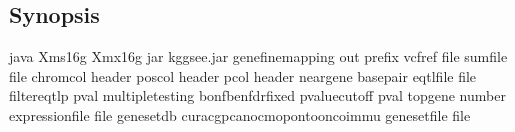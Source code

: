 \documentclass[letterpaper,10pt,english,openany,oneside]{sphinxmanual}
\begin{document}
\subsection{Synopsis}
\label{\detokenize{detailed_document:id2}}
\begin{sphinxVerbatim}[commandchars=\\\{\}]
java \PYGZhy{}Xms16g \PYGZhy{}Xmx16g \PYGZhy{}jar kggsee.jar
  \PYGZhy{}\PYGZhy{}gene\PYGZhy{}finemapping
  \PYGZhy{}\PYGZhy{}out \PYGZlt{}prefix\PYGZgt{}
  \PYGZhy{}\PYGZhy{}vcf\PYGZhy{}ref \PYGZlt{}file\PYGZgt{}
  \PYGZhy{}\PYGZhy{}sum\PYGZhy{}file \PYGZlt{}file\PYGZgt{}
  \PYGZhy{}\PYGZhy{}chrom\PYGZhy{}col \PYGZlt{}header\PYGZgt{}  
  \PYGZhy{}\PYGZhy{}pos\PYGZhy{}col \PYGZlt{}header\PYGZgt{}  
  \PYGZhy{}\PYGZhy{}p\PYGZhy{}col \PYGZlt{}header\PYGZgt{}  
  \PYGZhy{}\PYGZhy{}neargene \PYGZlt{}basepair\PYGZgt{}  
  \PYGZhy{}\PYGZhy{}eqtl\PYGZhy{}file \PYGZlt{}file\PYGZgt{}
  \PYGZhy{}\PYGZhy{}filter\PYGZhy{}eqtl\PYGZhy{}p \PYGZlt{}pval\PYGZgt{}  
  \PYGZhy{}\PYGZhy{}multiple\PYGZhy{}testing \PYGZlt{}bonfbenfdrfixed\PYGZgt{}  
  \PYGZhy{}\PYGZhy{}p\PYGZhy{}value\PYGZhy{}cutoff \PYGZlt{}pval\PYGZgt{}  
  \PYGZhy{}\PYGZhy{}top\PYGZhy{}gene \PYGZlt{}number\PYGZgt{}
  \PYGZhy{}\PYGZhy{}expression\PYGZhy{}file \PYGZlt{}file\PYGZgt{}
  \PYGZhy{}\PYGZhy{}geneset\PYGZhy{}db \PYGZlt{}curacgpcanocmopontooncoimmu\PYGZgt{}
  \PYGZhy{}\PYGZhy{}geneset\PYGZhy{}file \PYGZlt{}file\PYGZgt{}
\end{sphinxVerbatim}
\end{document}
